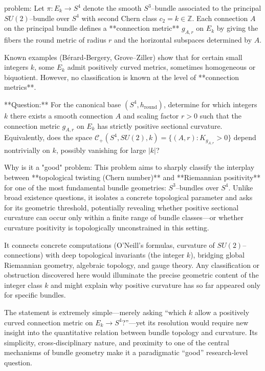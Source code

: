 problem:  
Let $\pi: E_k \to S^4$ denote the smooth $S^3$–bundle associated to the principal $SU(2)$–bundle over $S^4$ with second Chern class $c_2=k\in\mathbb{Z}$.  Each connection $A$ on the principal bundle defines a **connection metric** $g_{A,r}$ on $E_k$ by giving the fibers the round metric of radius $r$ and the horizontal subspaces determined by $A$.  

Known examples (Bérard‑Bergery, Grove–Ziller) show that for certain small integers $k$, some $E_k$ admit positively curved metrics, sometimes homogeneous or biquotient.  However, no classification is known at the level of **connection metrics**.

**Question:**  
For the canonical base $(S^4,h_\text{round})$, determine for which integers $k$ there exists a smooth connection $A$ and scaling factor $r>0$ such that the connection metric $g_{A,r}$ on $E_k$ has strictly positive sectional curvature.  
Equivalently, does the space $\mathcal C_+(S^4,\!SU(2),k)=\{(A,r): K_{g_{A,r}}>0\}$ depend nontrivially on $k$, possibly vanishing for large $|k|$?  

Why is it a "good" problem:  
This problem aims to sharply classify the interplay between **topological twisting (Chern number)** and **Riemannian positivity** for one of the most fundamental bundle geometries: $S^3$–bundles over $S^4$.  Unlike broad existence questions, it isolates a concrete topological parameter and asks for its geometric threshold, potentially revealing whether positive sectional curvature can occur only within a finite range of bundle classes—or whether curvature positivity is topologically unconstrained in this setting.  

It connects concrete computations (O’Neill’s formulas, curvature of $SU(2)$–connections) with deep topological invariants (the integer $k$), bridging global Riemannian geometry, algebraic topology, and gauge theory.  Any classification or obstruction discovered here would illuminate the precise geometric content of the integer class $k$ and might explain why positive curvature has so far appeared only for specific bundles.  

The statement is extremely simple—merely asking “which $k$ allow a positively curved connection metric on $E_k \to S^4$?”—yet its resolution would require new insight into the quantitative relation between bundle topology and curvature.  Its simplicity, cross‑disciplinary nature, and proximity to one of the central mechanisms of bundle geometry make it a paradigmatic “good” research‑level question.